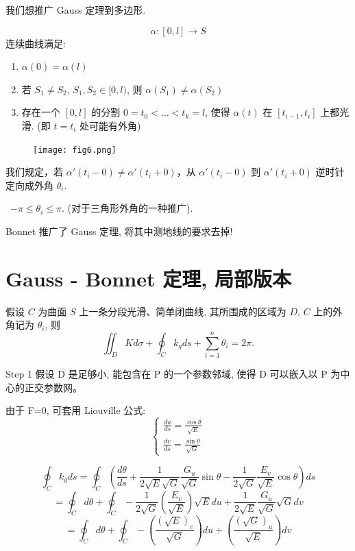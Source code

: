 \documentclass[lang=cn,10pt,thmcnt=section]{elegantbook}
\begin{document}
我们想推广 Gauss 定理到多边形.
\begin{definition}[分段光滑简单闭合曲线)]
    $$ \alpha: [0, l] \to S $$
连续曲线满足:
\begin{enumerate}
    \item $\alpha(0) = \alpha(l)$
    \item 若 $S_1 \neq S_2$, $S_1, S_2 \in [0, l)$, 则 $\alpha(S_1) \neq \alpha(S_2)$
    \item 存在一个 $[0, l]$ 的分割 $0=t_0 < \dots < t_k = l$, 使得 $\alpha(t)$ 在 $[t_{i-1}, t_i]$ 上都光滑. (即 $t=t_i$ 处可能有外角)
\end{enumerate}
\end{definition}
\begin{figure}[h]
    \centering
    \texttt{[image: fig6.png]} %
\end{figure}
\begin{definition}[外角]
    我们规定，若 $\alpha'(t_i-0) \ne \alpha'(t_i+0)$，从 $\alpha'(t_i-0)$ 到 $\alpha'(t_i+0)$ 逆时针定向成外角 $\theta_i$.

\textbullet \ $-\pi \le \theta_i \le \pi$. (对于三角形外角的一种推广).
\end{definition}

Bonnet 推广了 Gauss 定理, 将其中测地线的要求去掉!
\section{Gauss - Bonnet 定理, 局部版本}
\begin{theorem}
    假设 $C$ 为曲面 $S$ 上一条分段光滑、简单闭曲线,
其所围成的区域为 $D$, $C$ 上的外角记为 $\theta_i$, 则
$$ \iint_D K d\sigma + \oint_C k_g ds + \sum_{i=1}^n \theta_i = 2\pi. $$
\end{theorem}

Step 1 假设 D 是足够小, 能包含在 P 的一个参数邻域, 使得 D 可以嵌入以 P 为中心的正交参数网。

由于 F=0, 可套用 Liouville 公式:
$$
\begin{cases}
\frac{du}{ds} = \frac{\cos\theta}{\sqrt{E}} \\
\frac{dv}{ds} = \frac{\sin\theta}{\sqrt{G}}
\end{cases}
$$

$$
\oint_C k_g ds = \oint_C \left( \frac{d\theta}{ds} + \frac{1}{2\sqrt{E}\sqrt{G}} \frac{G_u}{\sqrt{G}} \sin\theta - \frac{1}{2\sqrt{G}} \frac{E_v}{\sqrt{E}} \cos\theta \right) ds
$$
$$
= \oint_C d\theta + \oint_C - \frac{1}{2\sqrt{G}} \left( \frac{E_v}{\sqrt{E}} \right) \sqrt{E} du + \frac{1}{2\sqrt{E}} \frac{G_u}{\sqrt{G}} \sqrt{G} dv
$$
$$
= \oint_C d\theta + \oint_C - \left( \frac{(\sqrt{E})_v}{\sqrt{G}} \right) du + \left( \frac{(\sqrt{G})_u}{\sqrt{E}} \right) dv
$$
\end{document}
